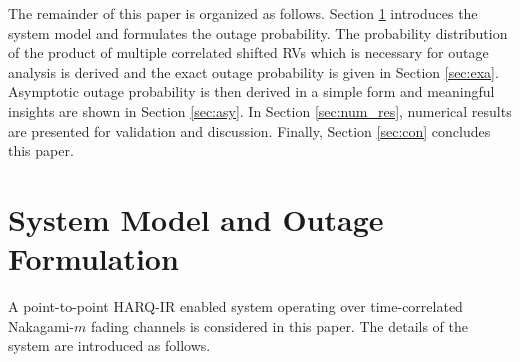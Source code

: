 \documentclass[12pt,onecolumn,draftcls]{IEEEtran}
\begin{document}



The remainder of this paper is organized as follows. Section \ref{sec:sys_mod} introduces the system model and formulates the outage probability. The probability distribution of the product of multiple correlated shifted RVs which is necessary for outage analysis is derived and the exact outage probability is given in Section \ref{sec:exa}. Asymptotic outage probability is then derived in a simple form and meaningful insights are shown in Section \ref{sec:asy}. In Section \ref{sec:num_res}, numerical results are presented for validation and discussion. Finally, Section \ref{sec:con} concludes this paper.

\section{System Model and Outage Formulation}\label{sec:sys_mod}
A point-to-point HARQ-IR enabled system operating over time-correlated Nakagami-$m$ fading channels is considered in this paper. The details of the system are introduced as follows.

\end{document}
